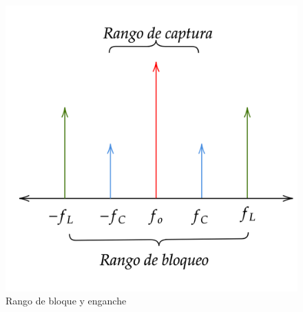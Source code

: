 \begin{figure}[H]
	\centering
	\includegraphics[scale=0.3]{ImagenesVarias/PLL_range2.png}
	\caption{Rango de bloque y enganche}
\end{figure}




